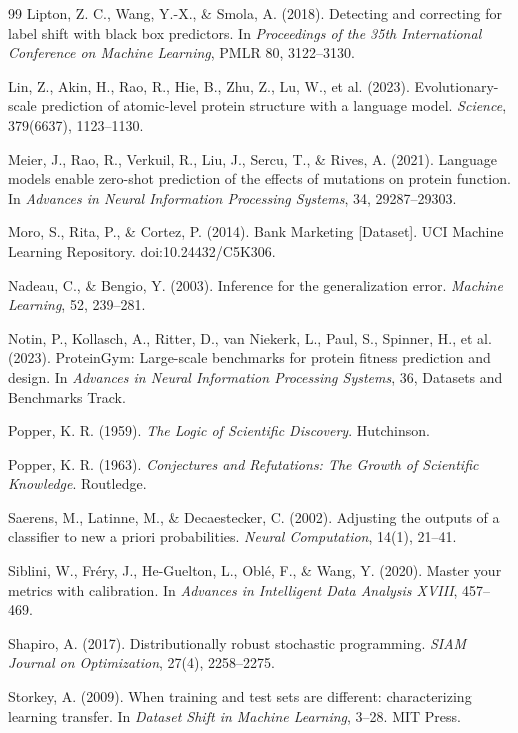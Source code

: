 \documentclass[11pt]{article}
\theoremstyle{remark}
\begin{document}
\begin{thebibliography}{99}
Lipton, Z. C., Wang, Y.-X., \& Smola, A. (2018).
Detecting and correcting for label shift with black box predictors.
In \emph{Proceedings of the 35th International Conference on Machine Learning}, PMLR 80, 3122--3130.

Lin, Z., Akin, H., Rao, R., Hie, B., Zhu, Z., Lu, W., et al. (2023).
Evolutionary-scale prediction of atomic-level protein structure with a language model.
\emph{Science}, 379(6637), 1123--1130.

Meier, J., Rao, R., Verkuil, R., Liu, J., Sercu, T., \& Rives, A. (2021).
Language models enable zero-shot prediction of the effects of mutations on protein function.
In \emph{Advances in Neural Information Processing Systems}, 34, 29287--29303.

Moro, S., Rita, P., \& Cortez, P. (2014).
Bank Marketing [Dataset].
UCI Machine Learning Repository. doi:10.24432/C5K306.

Nadeau, C., \& Bengio, Y. (2003).
Inference for the generalization error.
\emph{Machine Learning}, 52, 239--281.

Notin, P., Kollasch, A., Ritter, D., van Niekerk, L., Paul, S., Spinner, H., et al. (2023).
ProteinGym: Large-scale benchmarks for protein fitness prediction and design.
In \emph{Advances in Neural Information Processing Systems}, 36, Datasets and Benchmarks Track.

Popper, K. R. (1959).
\emph{The Logic of Scientific Discovery}.
Hutchinson.

Popper, K. R. (1963).
\emph{Conjectures and Refutations: The Growth of Scientific Knowledge}.
Routledge.

Saerens, M., Latinne, M., \& Decaestecker, C. (2002).
Adjusting the outputs of a classifier to new a priori probabilities.
\emph{Neural Computation}, 14(1), 21--41.

Siblini, W., Fr\'ery, J., He-Guelton, L., Obl\'e, F., \& Wang, Y. (2020).
Master your metrics with calibration.
In \emph{Advances in Intelligent Data Analysis XVIII}, 457--469.

Shapiro, A. (2017).
Distributionally robust stochastic programming.
\emph{SIAM Journal on Optimization}, 27(4), 2258--2275.

Storkey, A. (2009).
When training and test sets are different: characterizing learning transfer.
In \emph{Dataset Shift in Machine Learning}, 3--28. MIT Press.


\end{thebibliography}
\end{document}

